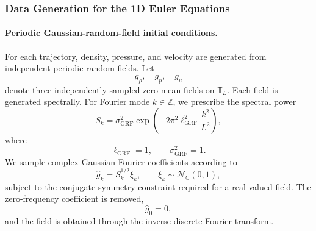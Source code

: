\documentclass[11pt]{article}
\begin{document}
\subsubsection{Data Generation for the 1D Euler Equations}
\label{app:euler_data_generation}
\paragraph{Periodic Gaussian-random-field initial conditions.}
For each trajectory, density, pressure, and velocity are generated from independent periodic random fields. Let
\[
    g_\rho,\quad g_p,\quad g_u
\]
denote three independently sampled zero-mean fields on $\mathbb{T}_L$. Each field is generated spectrally. For Fourier mode $k\in\mathbb{Z}$, we prescribe the spectral power
\[
    S_k
    =
    \sigma_{\mathrm{GRF}}^2
    \exp\left(
        -2\pi^2\ell_{\mathrm{GRF}}^2
        \frac{k^2}{L^2}
    \right),
\]
where
\[
    \ell_{\mathrm{GRF}}=1,
    \qquad
    \sigma_{\mathrm{GRF}}^2=1.
\]
We sample complex Gaussian Fourier coefficients according to
\[
    \widehat g_k
    =
    S_k^{1/2}\xi_k,
    \qquad
    \xi_k\sim\mathcal{N}_{\mathbb{C}}(0,1),
\]
subject to the conjugate-symmetry constraint required for a real-valued field. The zero-frequency coefficient is removed,
\[
    \widehat g_0=0,
\]
and the field is obtained through the inverse discrete Fourier transform.
\end{document}

